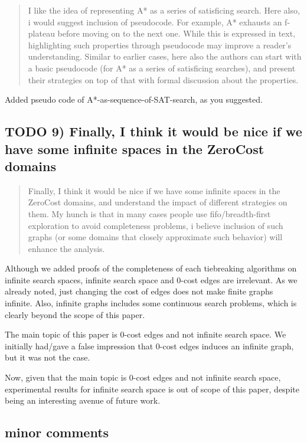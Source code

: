 \documentclass{article}
\begin{document}
\begin{quote}
 I like the idea of representing A* as a series of satisficing
search. Here also, i would suggest inclusion of pseudocode. For
example, A* exhausts an f-plateau before moving on to the next one.
While this is expressed in text, highlighting such properties through
pseudocode may improve a reader's understanding. Similar to earlier
cases, here also the authors can start with a basic pseudocode (for A*
as a series of satisficing searches), and present their strategies on
top of that with formal discussion about the properties.
\end{quote}

Added pseudo code of A*-as-sequence-of-SAT-search, as you suggested.

\subsection{{\bfseries\sffamily TODO} 9) Finally, I think it would be nice if we have some infinite spaces in the ZeroCost domains}
\label{sec:orgheadline22}

\begin{quote}
 Finally, I think it would be nice if we have some infinite spaces
in the ZeroCost domains, and understand the impact of different
strategies on them. My hunch is that in many cases people use
fifo/breadth-first exploration to avoid completeness problems, i
believe inclusion of such graphs (or some domains that closely
approximate such behavior) will enhance the analysis.
\end{quote}

Although we added proofs of the completeness of each tiebreaking algorithms
on infinite search spaces, infinite search space and 0-cost edges are irrelevant.
As we already noted,
just changing the cost of edges does not make finite graphs infinite.
Also, infinite graphs includes some continuous search problems,
which is clearly beyond the scope of this paper.

The main topic of this paper is 0-cost edges and not infinite search space.
We initially had/gave a false impression that 0-cost edges induces an infinite graph,
but it was not the case.

Now, given that the main topic is 0-cost edges and not infinite search space,
experimental results for infinite search space is out of scope of this paper,
despite being an interesting avenue of future work.

\subsection{minor comments}
\label{sec:orgheadline23}
\end{document}
